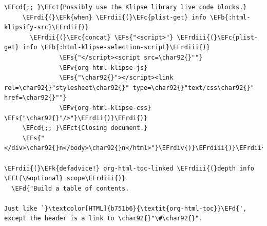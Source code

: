\documentclass{scrartcl}
\newcommand{\EFk}[1]{\textcolor{EFk}{#1}} %
\newcommand{\EFd}[1]{\textcolor{EFd}{\textit{#1}}} %
\newcommand{\EFt}[1]{\textcolor{EFt}{#1}} %
\newcommand{\EFs}[1]{\textcolor{EFs}{#1}} %
\newcommand{\EFb}[1]{\textcolor{EFb}{#1}} %
\newcommand{\EFct}[1]{\textcolor{EFct}{#1}} %
\newcommand{\EFc}[1]{\textcolor{EFc}{#1}} %
\newcommand{\EFv}[1]{\textcolor{EFv}{#1}} %
\newcommand{\EFcd}[1]{\textcolor{EFcd}{#1}} %
\newcommand{\EFrdi}[1]{\textcolor{EFrdi}{#1}} %
\newcommand{\EFrdii}[1]{\textcolor{EFrdii}{#1}} %
\newcommand{\EFrdiii}[1]{\textcolor{EFrdiii}{#1}} %
\newcommand{\EFrdiv}[1]{\textcolor{EFrdiv}{#1}} %
\begin{document}
\begin{Code}
\begin{Verbatim}[]
     \EFcd{;; }\EFct{Possibly use the Klipse library live code blocks.}
     \EFrdi{(}\EFk{when} \EFrdii{(}\EFc{plist-get} info \EFb{:html-klipsify-src}\EFrdii{)}
       \EFrdii{(}\EFc{concat} \EFs{"<script>"} \EFrdiii{(}\EFc{plist-get} info \EFb{:html-klipse-selection-script}\EFrdiii{)}
               \EFs{"</script><script src=\char92{}""}
               \EFv{org-html-klipse-js}
               \EFs{"\char92{}"></script><link rel=\char92{}"stylesheet\char92{}" type=\char92{}"text/css\char92{}" href=\char92{}""}
               \EFv{org-html-klipse-css} \EFs{"\char92{}"/>"}\EFrdii{)}\EFrdi{)}
     \EFcd{;; }\EFct{Closing document.}
     \EFs{"</div>\char92{}n</body>\char92{}n</html>"}\EFrdiv{)}\EFrdiii{)}\EFrdii{)}

\EFrdii{(}\EFk{defadvice!} org-html-toc-linked \EFrdiii{(}depth info \EFt{\&optional} scope\EFrdiii{)}
  \EFd{"Build a table of contents.

Just like `}\textcolor[HTML]{b751b6}{\textit{org-html-toc}}\EFd{', except the header is a link to \char92{}"\#\char92{}".


\end{Verbatim}
\end{Code}
\end{document}
